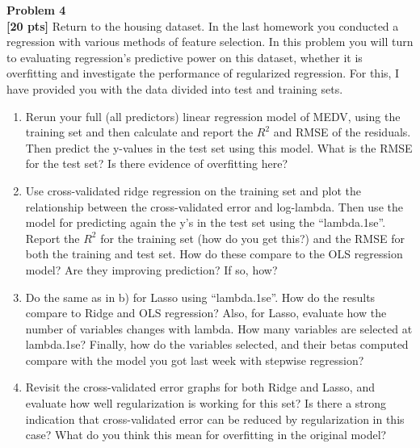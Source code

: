 \documentclass{article}
\newenvironment{problem}[2][Problem]
    { \begin{mdframed}[backgroundcolor=gray!20] \textbf{#1 #2} \\}
    {  \end{mdframed}}
\begin{document}
\newpage
\begin{problem}{4}
\textbf{[20 pts]}
Return to the housing dataset. In the last homework you conducted a regression with various methods of feature selection. In this problem you will turn to evaluating regression’s predictive power on this dataset, whether it is overfitting and investigate the performance of regularized regression. For this, I have provided you with the data divided into test and training sets.
\begin{enumerate}
	\item Rerun your full (all predictors) linear regression model of MEDV, using the training set and then calculate and report the $R^2$ and RMSE of the residuals. Then predict the y-values in the test set using this model. What is the RMSE for the test set? Is there evidence of overfitting here?
	\item Use cross-validated ridge regression on the training set and plot the relationship between the cross-validated error and log-lambda. Then use the model for predicting again the y’s in the test set using the “lambda.1se”. Report the $R^2$ for the training set (how do you get this?) and the RMSE for both the training and test set. How do these compare to the OLS regression model? Are they improving prediction? If so, how?
	\item Do the same as in b) for Lasso using “lambda.1se”. How do the results compare to Ridge and OLS regression? Also, for Lasso, evaluate how the number of variables changes with lambda. How many variables are selected at lambda.1se? Finally, how do the variables selected, and their betas computed compare with the model you got last week with stepwise regression?
	\item Revisit the cross-validated error graphs for both Ridge and Lasso, and evaluate how well regularization is working for this set? Is there a strong indication that cross-validated error can be reduced by regularization in this case? What do you think this mean for overfitting in the original model?
\end{enumerate}
\end{problem}
\end{document}
